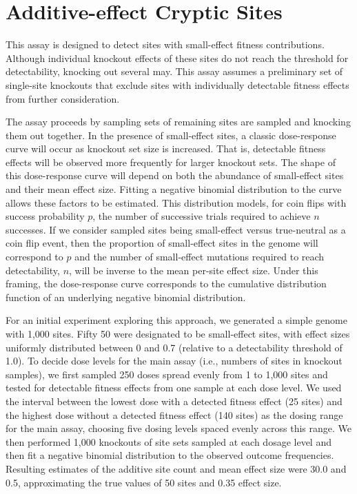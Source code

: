 \section{Additive-effect Cryptic Sites}

This assay is designed to detect sites with small-effect fitness contributions.
Although individual knockout effects of these sites do not reach the threshold for detectability, knocking out several may.
This assay assumes a preliminary set of single-site knockouts that exclude sites with individually detectable fitness effects from further consideration.

The assay proceeds by sampling sets of remaining sites are sampled and knocking them out together.
In the presence of small-effect sites, a classic dose-response curve will occur as knockout set size is increased.
That is, detectable fitness effects will be observed more frequently for larger knockout sets.
The shape of this dose-response curve will depend on both the abundance of small-effect sites and their mean effect size.
Fitting a negative binomial distribution to the curve allows these factors to be estimated.
This distribution models, for coin flips with success probability $p$, the number of successive trials required to achieve $n$ successes.
If we consider sampled sites being small-effect versus true-neutral as a coin flip event, then the proportion of small-effect sites in the genome will correspond to $p$ and the number of small-effect mutations required to reach detectability, $n$, will be inverse to the mean per-site effect size.
Under this framing, the dose-response curve corresponds to the cumulative distribution function of an underlying negative binomial distribution.

For an initial experiment exploring this approach, we generated a simple genome with 1,000 sites.
Fifty 50 were designated to be small-effect sites, with effect sizes uniformly distributed between 0 and 0.7 (relative to a detectability threshold of 1.0).
To decide dose levels for the main assay (i.e., numbers of sites in knockout samples), we first sampled 250 doses spread evenly from 1 to 1,000 sites and tested for detectable fitness effects from one sample at each dose level.
We used the interval between the lowest dose with a detected fitness effect (25 sites) and the highest dose without a detected fitness effect (140 sites) as the dosing range for the main assay, choosing five dosing levels spaced evenly across this range.
We then performed 1,000 knockouts of site sets sampled at each dosage level and then fit a negative binomial distribution to the observed outcome frequencies.
Resulting estimates of the additive site count and mean effect size were 30.0 and 0.5, approximating the true values of 50 sites and 0.35 effect size.

